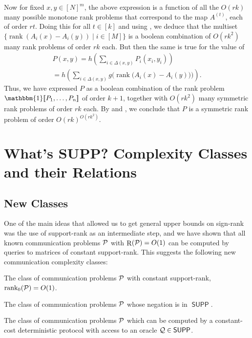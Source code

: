 \documentclass[conference]{IEEEtran}
\DeclareMathOperator{\suprank}{rank_0}
\DeclareMathOperator{\Rand}{R}
\DeclareMathOperator{\rank}{rank}
\newcommand{\cplxclass}[1]{\mathsf{#1}}
\let\P\undefined\DeclareMathOperator{\P}{\cplxclass{P}}
\DeclareMathOperator{\SUPP}{\cplxclass{SUPP}}
\DeclareMathOperator{\coSUPP}{\cplxclass{coSUPP}}
\begin{document}
\begin{IEEEproof}
Now for fixed $x,y\in [N]^m$, the above expression is a function of all the $O(rk)$ many possible monotone rank problems that correspond to the map $A^{(t)}$, each of order $rt$.
Doing this for all $t\in [k]$ and using , we deduce that the multiset $\{\rank(A_i(x)-A_i(y))\mid i\in [M]\}$ is a boolean combination of $O(rk^2)$ many rank problems of order $rk$ each. But then the same is true for the value of
\begin{align*}
	P(x,y) = h\!\left(\sum_{i \in \Delta(x,y)}P_i(x_i,y_i)\right) \\
    = h\!\left(\sum_{i \in \Delta(x,y)} g\Big(\rank\!\big(A_i(x)-A_i(y)\big)\Big)\right).
\end{align*}
Thus, we have expressed $P$ as a boolean combination of the rank problem $\mathbbm{1}\ldsbracket P_1, \dotsc, P_n \rdsbracket$ of order $k+1$, together with $O(rk^2)$ many symmetric rank problems of order $rk$ each. By  and , we conclude that $P$ is a symmetric rank problem of order $O(rk)^{O(rk^2)}$.
\end{IEEEproof}

\section{What's SUPP? Complexity Classes and their Relations}
\label{section:whatsupp}

\subsection{New Classes}
One of the main ideas that allowed us to get general upper bounds on sign-rank
was the use of support-rank as an intermediate step, and we have shown that all
known communication problems $\mathcal{P}$ with $\Rand(\cP) = O(1)$ can be computed by
queries to matrices of constant support-rank. This suggests the following new
communication complexity classes:

\begin{description}[leftmargin=!,labelwidth=1.4cm,labelsep=0.5em]
    \item[$\SUPP$:]
    The class of communication problems $\mathcal{P}$ with constant support-rank,
    $\suprank(\cP) = O(1)$.
    \item[$\coSUPP$:]
    The class of communication problems $\mathcal{P}$ whose negation is in $\SUPP$.
    \item[$\P^{\SUPP}$:]
    The class of communication problems $\mathcal{P}$ which can be computed by
    a constant-cost deterministic protocol with access to an oracle $\cQ \in \SUPP$.
\end{description}
\end{document}
